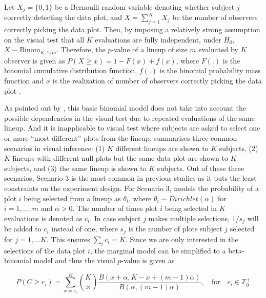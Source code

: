 \documentclass[]{interact}
\theoremstyle{plain}%
\theoremstyle{definition}
\theoremstyle{remark}
\begin{document}
Let \(X_j = \{0,1\}\) be a Bernoulli random variable denoting whether
subject \(j\) correctly detecting the data plot, and
\(X = \sum_{j=1}^{K}X_j\) be the number of observers correctly picking
the data plot. Then, by imposing a relatively strong assumption on the
visual test that all \(K\) evaluations are fully independent, under
\(H_0\), \(X \sim \mathrm{Binom}_{K,1/m}\). Therefore, the \(p\)-value
of a lineup of size \(m\) evaluated by \(K\) observer is given as
\(P(X \geq x) = 1 - F(x) + f(x)\), where \(F(.)\) is the binomial
cumulative distribution function, \(f(.)\) is the binomial probability
mass function and \(x\) is the realization of number of observers
correctly picking the data plot \citep{majumder_validation_2013}.

As pointed out by \citet{vanderplas2021statistical}, this basic binomial
model does not take into account the possible dependencies in the visual
test due to repeated evaluations of the same lineup. And it is
inapplicable to visual test where subjects are asked to select one or
more ``most different'' plots from the lineup.
\citet{vanderplas2021statistical} summarises three common scenarios in
visual inference: (1) \(K\) different lineups are shown to \(K\)
subjects, (2) \(K\) lineups with different null plots but the same data
plot are shown to \(K\) subjects, and (3) the same lineup is shown to
\(K\) subjects. Out of these three scenarios, Scenario 3 is the most
common in previous studies as it puts the least constraints on the
experiment design. For Scenario 3, \citet{vanderplas2021statistical}
models the probability of a plot \(i\) being selected from a lineup as
\(\theta_i\), where \(\theta_i \sim Dirichlet(\alpha)\) for
\(i=1,...,m\) and \(\alpha > 0\). The number of times plot \(i\) being
selected in \(K\) evaluations is denoted as \(c_i\). In case subject
\(j\) makes multiple selections, \(1/s_j\) will be added to \(c_i\)
instead of one, where \(s_j\) is the number of plots subject \(j\)
selected for \(j=1,...K\). This ensures \(\sum_{i}c_i=K\). Since we are
only interested in the selections of the data plot \(i\), the marginal
model can be simplified to a beta-binomial model and thus the visual
\(p\)-value is given as

\begin{equation} \label{eq:pvalue-beta-binomial}
P(C \geq c_i) = \sum_{x=c_i}^{K}{K \choose x}\frac{B(x + \alpha, K - x + (m - 1)\alpha)}{B(\alpha, (m-1)\alpha)},\quad \text{for} \quad c_i \in \mathbb{Z}_0^+
\end{equation}
\end{document}
